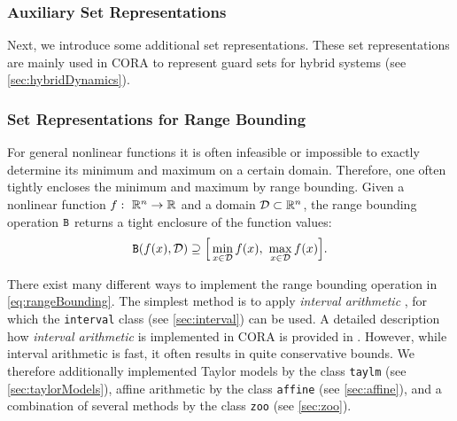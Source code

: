




\subsubsection{Auxiliary Set Representations}

Next, we introduce some additional set representations. These set representations are mainly used in CORA to represent guard sets for hybrid systems (see \cref{sec:hybridDynamics}).








\subsubsection{Set Representations for Range Bounding}
\label{sec:rangeBounding}

For general nonlinear functions it is often infeasible or impossible to exactly determine its minimum and maximum on a certain domain. Therefore, one often tightly encloses the minimum and maximum by range bounding. Given a nonlinear function $f:~\mathbb{R}^n \to \mathbb{R}$ and a domain $\mathcal{D} \subset \mathbb{R}^n$, the range bounding operation ${\normalfont \texttt{B}}$ returns a tight enclosure of the function values:
\begin{equation}
    {\normalfont \texttt{B}}(f(x),\mathcal{D}) \supseteq \Big [ \min_{x \in \mathcal{D}} f(x),~ \max_{x \in \mathcal{D}} f(x) \Big ].
    \label{eq:rangeBounding}
\end{equation}

There exist many different ways to implement the range bounding operation  in \eqref{eq:rangeBounding}. The simplest method is to apply \textit{interval arithmetic} \cite{Jaulin2006}, for which the \texttt{interval} class (see \cref{sec:interval}) can be used. A detailed description how \textit{interval arithmetic} is implemented in CORA is provided in \cite{Althoff2016a}. However, while interval arithmetic is fast, it often results in quite conservative bounds. We therefore additionally implemented Taylor models \cite{Makino2003} by the class \texttt{taylm} (see \cref{sec:taylorModels}), affine arithmetic \cite{deFigueiredo2004} by the class \texttt{affine} (see \cref{sec:affine}), and a combination of several methods by the class \texttt{zoo} (see \cref{sec:zoo}).

